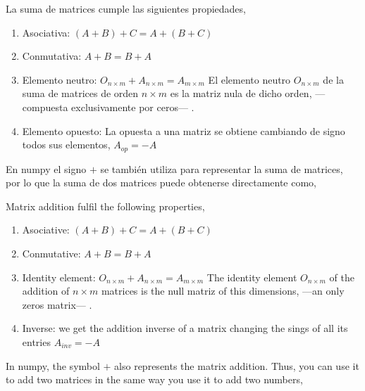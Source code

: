 \begin{paracol}{2}
La suma de matrices cumple las siguientes propiedades,
\begin{enumerate}
\item Asociativa: $(A+B)+C=A+(B+C)$
\item Conmutativa: $A+B=B+A$
\item Elemento neutro: $O_{n\times m}+A_{n\times m}=A_{m\times m}$ El elemento neutro $O_{n\times m}$ de la suma de matrices de orden $n\times m$ es la matriz nula de dicho orden, ---compuesta exclusivamente por ceros--- . 
\item Elemento opuesto: La opuesta a una matriz se obtiene cambiando de signo todos sus elementos, $A_{op}=-A$
\end{enumerate}
En numpy el signo $+$ se también utiliza para representar la suma de matrices, por lo que la suma de dos matrices puede obtenerse directamente como,

\switchcolumn
Matrix addition fulfil the following properties,
\begin{enumerate}
\item Asociative: $(A+B)+C=A+(B+C)$
\item Conmutative: $A+B=B+A$
\item Identity element: $O_{n\times m}+A_{n\times m}=A_{m\times m}$ The identity element $O_{n\times m}$ of the addition of  $n\times m$ matrices is the null matriz of this dimensions, ---an only zeros matrix--- . 
\item Inverse: we get the addition inverse of a matrix changing the sings of all its entries $A_{inv}=-A$
\end{enumerate}
In numpy, the symbol $+$ also represents the matrix addition. Thus, you can use it to add two matrices in the same way you use it to add two numbers,
\end{paracol}

